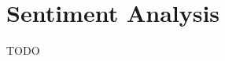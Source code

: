 
\section{Sentiment Analysis}
\label{sec:sentiment_analysis}

\cite{tripathy2016classification}
\cite{mullen2004sentiment}
\cite{pouransari2014deep}

TODO